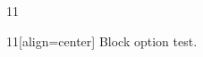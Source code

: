 \documentclass[paper=A4]{ropas-poster}
\begin{document}
\begin{postergrid}{1}{1}
\begin{posterblock}{1}{1}[align=center]
Block option test.
\end{posterblock}
\end{postergrid}
\end{document}
